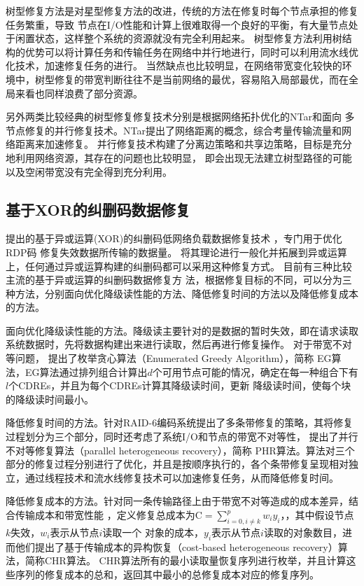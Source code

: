 树型修复方法是对星型修复方法的改进，传统的方法在修复时每个节点承担的修复任务繁重，导致
节点在I/O性能和计算上很难取得一个良好的平衡，有大量节点处于闲置状态，这样整个系统的资源就没有完全利用起来。
树型修复方法利用树结构的优势可以将计算任务和传输任务在网络中并行地进行，同时可以利用流水线优化技术，加速修复任务的进行。
当然缺点也比较明显，在网络带宽变化较快的环境中，树型修复的带宽判断往往不是当前网络的最优，容易陷入局部最优，而在全局来看也同样浪费了部分资源。

另外两类比较经典的树型修复修复技术分别是根据网络拓扑优化的NTar\cite{许方亮2013ntar}和面向
多节点修复的并行修复技术\cite{weidong2013tree}。NTar提出了网络距离的概念，综合考量传输流量和网络距离来加速修复。
并行修复技术\cite{weidong2013tree}构建了分离边策略和共享边策略，目标是充分地利用网络资源，其存在的问题也比较明显，
即会出现无法建立树型路径的可能以及空闲带宽没有完全得到充分利用。

\subsection{基于XOR的纠删码数据修复}



\citet{xiang2010optimal}提出的基于异或运算(XOR)的纠删码低网络负载数据修复技术
，专门用于优化RDP码\cite{corbett2004row}
修复失效数据所传输的数据量。
\citet{khan2012rethinking}将其理论进行一般化并拓展到异或运算上，任何通过异或运算构建的纠删码都可以采用这种修复方式。
目前有三种比较主流的基于异或运算的纠删码数据修复方
法，根据修复目标的不同，可以分为三种方法，分别面向优化降级读性能的方法、降低修复时间的方法以及降低修复成本的方法。

面向优化降级读性能的方法。降级读主要针对的是数据的暂时失效，即在请求读取系统数据时，先将数据构建出来进行读取，然后再进行修复操作。
对于带宽不对等问题，
\citet{zhu2014boosting}提出了枚举贪心算法（Enumerated Greedy Algorithm），简称
EG算法，EG算法通过排列组合计算出$d$个可用节点可能的情况，确定在每一种组合下有$l$个CDREs，并且为每个CDREs计算其降级读时间，更新
降级读时间，使每个块的降级读时间最小。

降低修复时间的方法。\citet{niu2013phr}针对RAID-6编码系统提出了多条带修复的策略，其将修复过程划分为三个部分，同时还考虑了系统I/O和节点的带宽不对等性，
提出了并行不对等修复算法（parallel heterogeneous recovery），简称
PHR算法。算法对三个部分的修复过程分别进行了优化，并且是按顺序执行的，各个条带修复呈现相对独立，通过线程技术和流水线修复技术可以加速修复任务，从而降低修复时间。

降低修复成本的方法。针对同一条传输路径上由于带宽不对等造成的成本差异，\citet{zhu2012cost}结合传输成本和带宽性能
，定义修复总成本为$\mathrm{C}=\sum_{i=0, i \neq k}^{p} w_{i} y_{i}$，，其中假设节点$k$失效，$w_i$表示从节点$i$读取一个
对象的成本，$y_i$表示从节点$i$读取的对象数目，进而他们提出了基于传输成本的异构恢复（cost-based heterogeneous recovery）算法，简称CHR算法。
CHR算法所有的最小读取量恢复序列进行枚举，并且计算这些序列的修复成本的总和，返回其中最小的总修复成本对应的修复序列。


